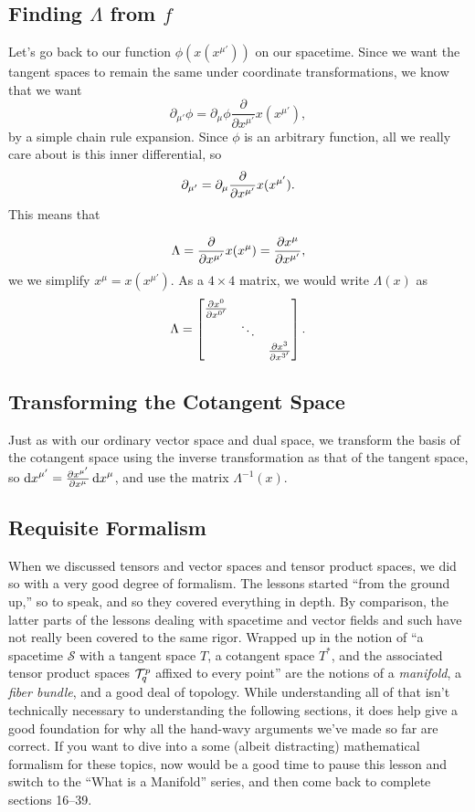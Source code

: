 \subsection{Finding $\Lambda$ from $f$}
Let's go back to our function $\phi(x(x^{\mu'}))$ on our spacetime.
Since we want the tangent spaces to remain the same under coordinate transformations, we know that we want
\[ \partial_{\mu'} \phi = \partial_\mu \phi \frac{\partial}{\partial{x^{\mu'}}}x(x^{\mu'}), \]
by a simple chain rule expansion.
Since $\phi$ is an arbitrary function, all we really care about is this inner differential, so
\[ \partial_{\mu'} = \partial_\mu \pdv{}{x^{\mu'}}x(x^{\mu'}). \]
This means that 

\[ \Lambda = \pdv{}{x^{\mu'}} x\qty(x^\mu) = \pdv{x^\mu}{x^{\mu'}}, \]
we we simplify $x^\mu = x(x^{\mu'})$.
As a  $4\times 4$ matrix, we would write $\Lambda(x)$ as 
\[ \Lambda = 
    \begin{bmatrix}
        \pdv{x^0}{x^{0'}} & & \\
        & \ddots & \\
        & & \pdv{x^3}{x^{3'}}
    \end{bmatrix}.
\]
\subsection{Transforming the Cotangent Space}
Just as with our ordinary vector space and dual space, we transform the basis of the cotangent space using the inverse transformation as that of the tangent space, so $\dd{x}^{\mu'} = \pdv{x^{\mu'}}{x^\mu} \dd{x}^\mu$, and use the matrix $\Lambda^{-1}(x)$.

\subsection{Requisite Formalism}
When we discussed tensors and vector spaces and tensor product spaces, we did so with a very good degree of formalism.
The lessons started ``from the ground up,'' so to speak, and so they covered everything in depth.
By comparison, the latter parts of the lessons dealing with spacetime and vector fields and such have not really been covered to the same rigor.
Wrapped up in the notion of ``a spacetime $\mathcal{S}$ with a tangent space $T$, a cotangent space $T^*$, and the associated tensor product spaces $\mathcal{T}^p_q$ affixed to every point'' are the notions of a \emph{manifold}, a \emph{fiber bundle}, and a good deal of topology.
While understanding all of that isn't technically necessary to understanding the following sections, it does help give a good foundation for why all the hand-wavy arguments we've made so far are correct.
If you want to dive into a some (albeit distracting) mathematical formalism for these topics, now would be a good time to pause this lesson and switch to the ``What is a Manifold'' series, and then come back to complete sections 16--39.
